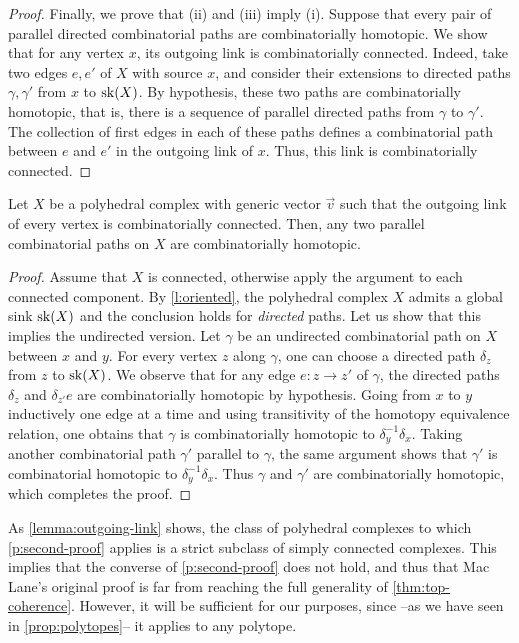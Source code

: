 \begin{proof}
    Finally, we prove that (ii) and (iii) imply (i).
    Suppose that every pair of parallel directed combinatorial paths are combinatorially homotopic. 
    We show that for any vertex $x$, its outgoing link is combinatorially connected. 
    Indeed, take two edges $e,e'$ of $X$ with source $x$, and consider their extensions to directed paths $\gamma, \gamma'$ from $x$ to $\mathrm{sk}(X)$. 
    By hypothesis, these two paths are combinatorially homotopic, that is, there is a sequence of parallel directed paths from $\gamma$ to $\gamma'$. 
    The collection of first edges in each of these paths defines a combinatorial path between $e$ and $e'$ in the outgoing link of $x$. 
    Thus, this link is combinatorially connected. 
\end{proof}

\begin{thm}
\label{p:second-proof}
    Let $X$ be a polyhedral complex with generic vector $\vec v$ such that the outgoing link of every vertex is combinatorially connected.
    Then, any two parallel combinatorial paths on $X$ are combinatorially homotopic.
\end{thm}

\begin{proof} 
    Assume that $X$ is connected, otherwise apply the argument to each connected component.
    By \cref{l:oriented}, the polyhedral complex $X$ admits a global sink $\mathrm{sk}(X)$ and the conclusion holds for \emph{directed} paths.  
    Let us show that this implies the undirected version.
    Let $\gamma$ be an undirected combinatorial path on $X$ between $x$ and $y$.
    For every vertex $z$ along $\gamma$, one can choose a directed path $\delta_z$ from $z$ to $\mathrm{sk}(X)$. 
    We observe that for any edge $e: z \to z'$ of $\gamma$, the directed paths $\delta_z$ and $\delta_{z'}e$ are combinatorially homotopic by hypothesis. 
    Going from $x$ to $y$ inductively one edge at a time and using transitivity of the homotopy equivalence relation, one obtains that $\gamma$ is combinatorially homotopic to $\delta_y^{-1}\delta_x$. 
    Taking another combinatorial path $\gamma'$ parallel to $\gamma$, the same argument shows that $\gamma'$ is combinatorial homotopic to $\delta_y^{-1}\delta_x$.
    Thus $\gamma$ and $\gamma'$ are combinatorially homotopic, which completes the proof. 
\end{proof}

As \cref{lemma:outgoing-link} shows, the class of polyhedral complexes to which \cref{p:second-proof} applies is a strict subclass of simply connected complexes.
This implies that the converse of \cref{p:second-proof} does not hold, and thus that Mac Lane's original proof is far from reaching the full generality of \cref{thm:top-coherence}.
However, it will be sufficient for our purposes, since --as we have seen in \cref{prop:polytopes}-- it applies to any polytope.

